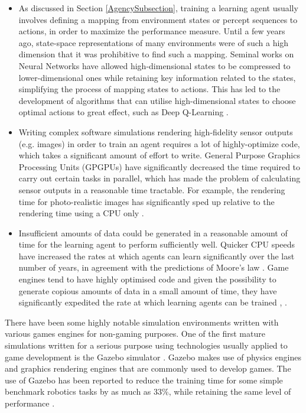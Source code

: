 \begin{itemize}
    \item
    As discussed in Section \ref{AgencySubsection}, training a learning agent usually involves defining a mapping from environment states or percept sequences to actions, in order to maximize the performance measure. Until a few years ago, state-space representations of many environments were of such a high dimension that it was prohibitive to find such a mapping. Seminal works on Neural Networks \cite{Lecun1998Gradient-BasedRecognition} \cite{Krizhevsky2012ImageNetNetworks} have allowed high-dimensional states to be compressed to lower-dimensional ones while retaining key information related to the states, simplifying the process of mapping states to actions. This has led to the development of algorithms that can utilise high-dimensional states to choose optimal actions to great effect, such as Deep Q-Learning \cite{Mnih2013PlayingLearning}.
    \item Writing complex software simulations rendering high-fidelity sensor outputs (e.g. images) in order to train an agent requires a lot of highly-optimize code, which takes a significant amount of effort to write.
    General Purpose Graphics Processing Units (GPGPUs) have significantly decreased the time required to carry out certain tasks in parallel, which has made the problem of calculating sensor outputs in a reasonable time tractable. For example, the rendering time for photo-realistic images has significantly sped up relative to the rendering time using a CPU only \cite{Ryoo2008OptimizationCUDA}.
    \item Insufficient amounts of data could be generated in a reasonable amount of time for the learning agent to perform sufficiently well. Quicker CPU speeds have increased the rates at which agents can learn significantly over the last number of years, in agreement with the predictions of Moore's law \cite{MacK2011FiftyLaw}. Game engines tend to have highly optimised code and given the possibility to generate copious amounts of data in a small amount of time, they have significantly expedited the rate at which learning agents can be trained \cite{Juliani2018Unity:Agents}, \cite{Sadeghi2016CADImage}. 
\end{itemize}

There have been some highly notable simulation environments written with various games engines for non-gaming purposes. One of the first mature simulations written for a serious purpose using technologies usually applied to game development is the Gazebo simulator \cite{Koenig2005DesignSimulator}. Gazebo makes use of physics engines and graphics rendering engines that are commonly used to develop games. The use of Gazebo has been reported to reduce the training time for some simple benchmark robotics tasks by as much as 33\%, while retaining the same level of performance \cite{Vilches2018RobotGazebo}. 

